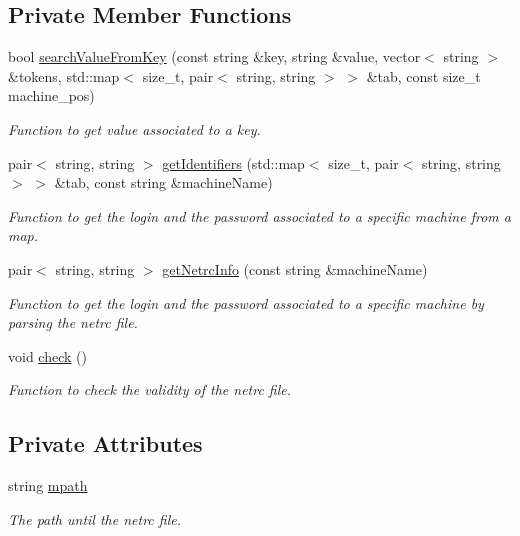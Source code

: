 \subsection*{Private Member Functions}
\begin{DoxyCompactItemize}
\item 
bool \hyperlink{classNetrcReader_a502e087b9254713d86adcb750058b1a2}{searchValueFromKey} (const string \&key, string \&value, vector$<$ string $>$ \&tokens, std::map$<$ size\_\-t, pair$<$ string, string $>$ $>$ \&tab, const size\_\-t machine\_\-pos)
\begin{DoxyCompactList}\small\item\em Function to get value associated to a key. \item\end{DoxyCompactList}\item 
pair$<$ string, string $>$ \hyperlink{classNetrcReader_af34324922c7b658e1cffdec4ebb2bff9}{getIdentifiers} (std::map$<$ size\_\-t, pair$<$ string, string $>$ $>$ \&tab, const string \&machineName)
\begin{DoxyCompactList}\small\item\em Function to get the login and the password associated to a specific machine from a map. \item\end{DoxyCompactList}\item 
pair$<$ string, string $>$ \hyperlink{classNetrcReader_a0429aed611cf9065c277c011a977fa9d}{getNetrcInfo} (const string \&machineName)
\begin{DoxyCompactList}\small\item\em Function to get the login and the password associated to a specific machine by parsing the netrc file. \item\end{DoxyCompactList}\item 
void \hyperlink{classNetrcReader_ab4ad93bf19ce8654d56cd5f5eada7d20}{check} ()
\begin{DoxyCompactList}\small\item\em Function to check the validity of the netrc file. \item\end{DoxyCompactList}\end{DoxyCompactItemize}
\subsection*{Private Attributes}
\begin{DoxyCompactItemize}
\item 
\hypertarget{classNetrcReader_a780a28e35c823c66ff62c75186fb7d15}{
string \hyperlink{classNetrcReader_a780a28e35c823c66ff62c75186fb7d15}{mpath}}
\label{classNetrcReader_a780a28e35c823c66ff62c75186fb7d15}

\begin{DoxyCompactList}\small\item\em The path until the netrc file. \item\end{DoxyCompactList}\end{DoxyCompactItemize}


